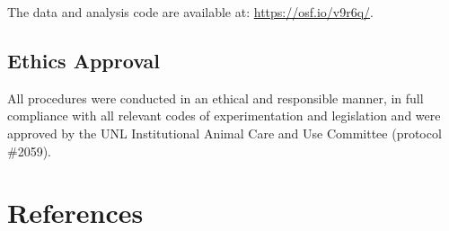 \documentclass[
  pub]{apa6}
\begin{document}
The data and analysis code are available at: \url{https://osf.io/v9r6q/}.

\subsection{Ethics Approval}\label{ethics-approval}

All procedures were conducted in an ethical and responsible manner, in full compliance with all relevant codes of experimentation and legislation and were approved by the UNL Institutional Animal Care and Use Committee (protocol \#2059).

\section{References}\label{references}

\scriptsize
\end{document}
